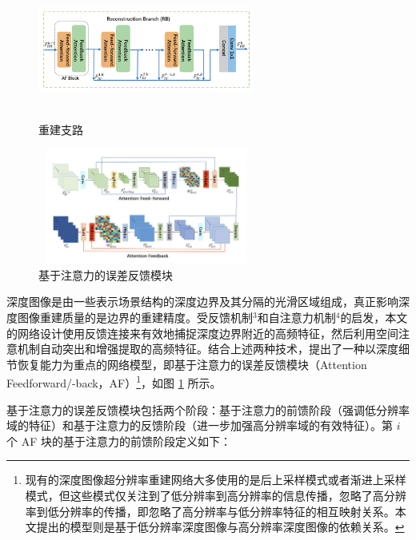 \documentclass[14px]{article}
\begin{document}
\begin{figure}[!htbp]
	\begin{minipage}[t]{0.5\linewidth}
		\centering
		\includegraphics[height=1.5in,width=2.8in]{img/RB}
		\caption{重建支路}
		\label{fig:RB}
	\end{minipage}
	\begin{minipage}[t]{0.5\linewidth}
		\centering
		\includegraphics[height=1.5in,width=2.8in]{img/AF}
		\caption{基于注意力的误差反馈模块 }
		\label{fig:AF}
	\end{minipage}
\end{figure}

深度图像是由一些表示场景结构的深度边界及其分隔的光滑区域组成，真正影响深度图像重建质量的是边界的重建精度。受反馈机制$^3$和自注意力机制$^4$的启发，本文的网络设计使用反馈连接来有效地捕捉深度边界附近的高频特征，然后利用空间注意机制自动突出和增强提取的高频特征。结合上述两种技术，提出了一种以深度细节恢复能力为重点的网络模型，即基于注意力的误差反馈模块（Attention Feedforward/-back，AF）\footnote{现有的深度图像超分辨率重建网络大多使用的是后上采样模式或者渐进上采样模式，但这些模式仅关注到了低分辨率到高分辨率的信息传播，忽略了高分辨率到低分辨率的传播，即忽略了高分辨率与低分辨率特征的相互映射关系。本文提出的模型则是基于低分辨率深度图像与高分辨率深度图像的依赖关系。}，如图 \ref{fig:AF} 所示。

基于注意力的误差反馈模块包括两个阶段：基于注意力的前馈阶段（强调低分辨率域的特征）和基于注意力的反馈阶段（进一步加强高分辨率域的有效特征）。第 $i$ 个 AF 块的基于注意力的前馈阶段定义如下：
\end{document}
